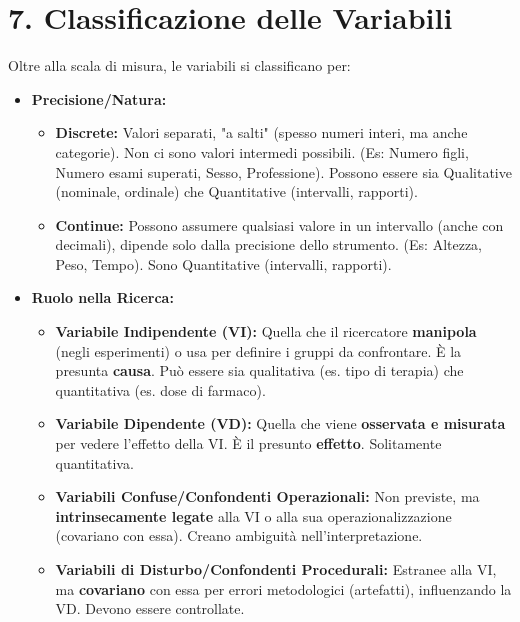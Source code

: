\documentclass[12pt, a4paper]{article}
\begin{document}
\section*{7. Classificazione delle Variabili}
Oltre alla scala di misura, le variabili si classificano per:
\begin{itemize}
    \item \textbf{Precisione/Natura:}
        \begin{itemize}
            \item \textbf{Discrete:} Valori separati, "a salti" (spesso numeri interi, ma anche categorie). Non ci sono valori intermedi possibili. (Es: Numero figli, Numero esami superati, Sesso, Professione). Possono essere sia Qualitative (nominale, ordinale) che Quantitative (intervalli, rapporti).
            \item \textbf{Continue:} Possono assumere qualsiasi valore in un intervallo (anche con decimali), dipende solo dalla precisione dello strumento. (Es: Altezza, Peso, Tempo). Sono Quantitative (intervalli, rapporti).
        \end{itemize}
    \item \textbf{Ruolo nella Ricerca:}
        \begin{itemize}
            \item \textbf{Variabile Indipendente (VI):} Quella che il ricercatore \textbf{manipola} (negli esperimenti) o usa per definire i gruppi da confrontare. È la presunta \textbf{causa}. Può essere sia qualitativa (es. tipo di terapia) che quantitativa (es. dose di farmaco).
            \item \textbf{Variabile Dipendente (VD):} Quella che viene \textbf{osservata e misurata} per vedere l'effetto della VI. È il presunto \textbf{effetto}. Solitamente quantitativa.
            \item \textbf{Variabili Confuse/Confondenti Operazionali:} Non previste, ma \textbf{intrinsecamente legate} alla VI o alla sua operazionalizzazione (covariano con essa). Creano ambiguità nell'interpretazione.
            \item \textbf{Variabili di Disturbo/Confondenti Procedurali:} Estranee alla VI, ma \textbf{covariano} con essa per errori metodologici (artefatti), influenzando la VD. Devono essere controllate.
        \end{itemize}
\end{itemize}
\end{document}
